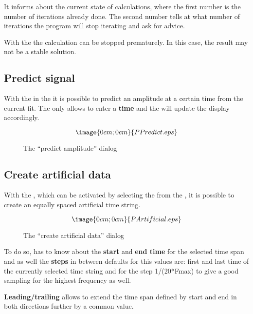 It informs about the current state of calculations, 
where the first number is the number of iterations already done.
The second number tells at what number of iterations the program will stop 
iterating and ask for advice.

With the  the calculation can be stopped prematurely.
In this case, the result may not be a stable solution.

\subsection{Predict signal}%
\label{period.predict}
With the  in the  it is possible to 
predict an amplitude at a certain time from the current fit.
The  only
allows to enter a {\bf time} and the 
will update the display accordingly.
\begin{figure}[h]
$$\image{0cm;0cm}{PPredict.eps}$$%
\caption{The ``predict amplitude'' dialog}%
\label{period.predict.dialog}
\end{figure}

\subsection{Create artificial data}%
\label{period.artificial}
With the
,
which can be activated by selecting the
 from the , 
it is possible to create an equally spaced artificial time string.
\begin{figure}[h]
$$\image{0cm;0cm}{PArtificial.eps}$$%
\caption{The ``create artificial data'' dialog}%
\label{period.artificial.dialog}
\end{figure}

To do so, \period has to know about the {\bf start} and {\bf end time} 
for the selected time span
and as well the {\bf steps} in between
defaults for this values are: first and last time of the 
currently selected time string and for the step 1/(20*Fmax) to give a good 
sampling for the highest frequency as well.

{\bf Leading/trailing} allows to extend the time span defined by start
and end in both directions further by a common value.


